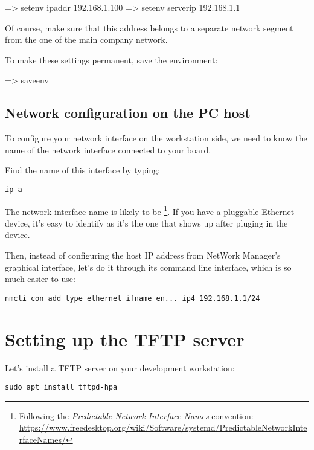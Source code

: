 \begin{ubootinput}
=> setenv ipaddr 192.168.1.100
=> setenv serverip 192.168.1.1
\end{ubootinput}

Of course, make sure that this address belongs to a separate network
segment from the one of the main company network.

To make these settings permanent, save the environment:

\begin{ubootinput}
=> saveenv
\end{ubootinput}

\subsection{Network configuration on the PC host}

To configure your network interface on the workstation side, we need
to know the name of the network interface connected to your board.

Find the name of this interface by typing:

\begin{verbatim}
ip a
\end{verbatim}

The network interface name is likely to be
\footnote{Following the {\em Predictable Network Interface
Names} convention:
\url{https://www.freedesktop.org/wiki/Software/systemd/PredictableNetworkInterfaceNames/}}.
If you have a pluggable Ethernet device, it's easy to identify as it's
the one that shows up after pluging in the device.

Then, instead of configuring the host IP address from NetWork Manager's
graphical interface, let's do it through its command line interface,
which is so much easier to use:

\begin{verbatim}
nmcli con add type ethernet ifname en... ip4 192.168.1.1/24
\end{verbatim}

\section{Setting up the TFTP server}

Let's install a TFTP server on your development workstation:

\begin{verbatim}
sudo apt install tftpd-hpa
\end{verbatim}

